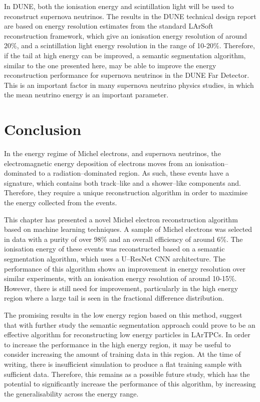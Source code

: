 In DUNE, both the ionisation energy and scintillation light will be used to
reconstruct supernova neutrinos. The results in the DUNE technical design
report are based on energy resolution estimates from the standard
LArSoft reconstruction framework, which give an ionisation energy resolution of
around 20\%, and a scintillation light energy resolution in the range of
10-20\%\cite{Abi:2020evt}. Therefore, if the tail at high energy can be
improved, a semantic segmentation algorithm, similar to the one presented
here, may be able to improve the energy reconstruction performance for
supernova neutrinos in the DUNE Far Detector. This is an important factor in
many supernova neutrino physics studies, in which the mean neutrino energy is an
important parameter\cite{Abi:2020evt}.

\section{Conclusion} \label{ME_EU}

In the energy regime of Michel electrons, and supernova neutrinos, the
electromagnetic energy deposition of electrons moves from an 
ionisation--dominated to a radiation--dominated region. As such, these events 
have a signature, which contains both track--like and a shower--like 
components and. Therefore, they require a unique reconstruction algorithm in 
order to maximise the energy collected from the events.

This chapter has presented a novel Michel electron reconstruction algorithm 
based on machine learning techniques. A sample of Michel electrons was 
selected in \protodune{} data with a purity of over 98\% and an overall 
efficiency of around 6\%. The ionisation energy of these events was 
reconstructed based on a semantic segmentation algorithm, which uses a 
U--ResNet CNN architecture. The performance of this algorithm shows an 
improvement in energy resolution over similar experiments, with an ionisation 
energy resolution of around 10-15\%. However, there is still need for 
improvement, particularly in the high energy region where a large tail is seen 
in the fractional difference distribution.

The promising results in the low energy region based on this method, suggest
that with further study the semantic segmentation approach could prove to be an
effective algorithm for reconstructing low energy particles in LArTPCs. In 
order to increase the performance in the high energy region, it may be useful 
to consider increasing the amount of training data in this region. At the time 
of writing, there is insufficient \protodune{} simulation to produce a flat 
training sample with sufficient data. Therefore, this remains as a possible 
future study, which has the potential to significantly increase the 
performance of this algorithm, by increasing the generalisability across the 
energy range.
